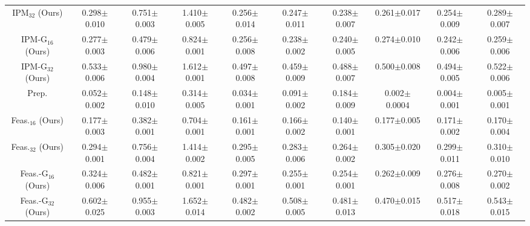 \begin{table*}[t]
{\begin{tabular}{c|ccc|ccc|ccc}
IPM$_{32}$ (Ours) & 0.298\scriptsize$\pm$0.010 & 0.751\scriptsize$\pm$0.003 & 1.410\scriptsize$\pm$0.005 & 0.256\scriptsize$\pm$0.014 & 0.247\scriptsize$\pm$0.011 & 0.238\scriptsize$\pm$0.007 & 0.261\scriptsize$\pm$0.017 & 0.254\scriptsize$\pm$0.009 & 0.289\scriptsize$\pm$0.007\\
IPM-G$_{16}$ (Ours) & 0.277\scriptsize$\pm$0.003 & 0.479\scriptsize$\pm$0.006 & 0.824\scriptsize$\pm$0.001 
& 0.256\scriptsize$\pm$0.008 & 0.238\scriptsize$\pm$0.002 & 0.240\scriptsize$\pm$0.005 
& 0.274\scriptsize$\pm$0.010 & 0.242\scriptsize$\pm$0.006 & 0.259\scriptsize$\pm$0.006 \\
IPM-G$_{32}$ (Ours) & 0.533\scriptsize$\pm$0.006 & 0.980\scriptsize$\pm$0.004 & 1.612\scriptsize$\pm$0.001 
& 0.497\scriptsize$\pm$0.008 & 0.459\scriptsize$\pm$0.009 & 0.488\scriptsize$\pm$0.007 
& 0.500\scriptsize$\pm$0.008 & 0.494\scriptsize$\pm$0.005 & 0.522\scriptsize$\pm$0.006 \\
\midrule
Prep. & 0.052\scriptsize$\pm$0.002 & 0.148\scriptsize$\pm$0.010 & 0.314\scriptsize$\pm$0.005 
& 0.034\scriptsize$\pm$0.001 & 0.091\scriptsize$\pm$0.002 & 0.184\scriptsize$\pm$0.009 
& 0.002\scriptsize$\pm$0.0004 & 0.004\scriptsize$\pm$0.001 & 0.005\scriptsize$\pm$0.001 \\
Feas.$_{16}$ (Ours) & 0.177\scriptsize$\pm$0.003 & 0.382\scriptsize$\pm$0.001 & 0.704\scriptsize$\pm$0.001 
& 0.161\scriptsize$\pm$0.001 & 0.166\scriptsize$\pm$0.002 & 0.140\scriptsize$\pm$0.001 
& 0.177\scriptsize$\pm$0.005 & 0.171\scriptsize$\pm$0.002 & 0.170\scriptsize$\pm$0.004 \\
Feas.$_{32}$ (Ours) & 0.294\scriptsize$\pm$0.001 & 0.756\scriptsize$\pm$0.004 & 1.414\scriptsize$\pm$0.002
& 0.295\scriptsize$\pm$0.005 & 0.283\scriptsize$\pm$0.006 & 0.264\scriptsize$\pm$0.002
& 0.305\scriptsize$\pm$0.020 & 0.299\scriptsize$\pm$0.011 & 0.310\scriptsize$\pm$0.010 \\
Feas.-G$_{16}$ (Ours) & 0.324\scriptsize$\pm$0.006 & 0.482\scriptsize$\pm$0.001 & 0.821\scriptsize$\pm$0.001 & 0.297\scriptsize$\pm$0.001 & 0.255\scriptsize$\pm$0.001 & 0.254\scriptsize$\pm$0.001 & 0.262\scriptsize$\pm$0.009 & 0.276\scriptsize$\pm$0.008 & 0.270\scriptsize$\pm$0.002 \\
Feas.-G$_{32}$ (Ours) & 0.602\scriptsize$\pm$0.025 & 0.955\scriptsize$\pm$0.003 & 1.652\scriptsize$\pm$0.014 & 0.482\scriptsize$\pm$0.002 & 0.508\scriptsize$\pm$0.005 & 0.481\scriptsize$\pm$0.013 & 0.470\scriptsize$\pm$0.015 & 0.517\scriptsize$\pm$0.018 & 0.543\scriptsize$\pm$0.015 \\
\bottomrule
\end{tabular}
}
\end{table*}









